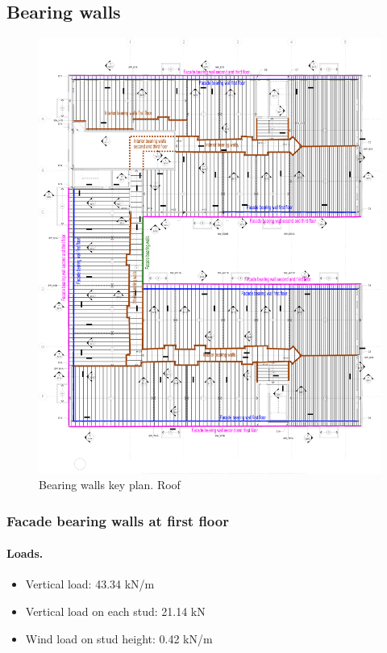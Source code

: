\subsection{Bearing walls}

\begin{figure}
  \begin{center}
  \includegraphics[width=120mm]{figures/bearing_walls_key_plan}
  \end{center}
  \caption{Bearing walls key plan. Roof}\label{fg_bearing_walls_key_plan}
\end{figure}

\subsubsection{Facade bearing walls at first floor}

\paragraph{Loads.}

\begin{itemize}
\item Vertical load: 43.34 kN/m
\item Vertical load on each stud: 21.14 kN
\item Wind load on stud height: 0.42 kN/m
\end{itemize}


